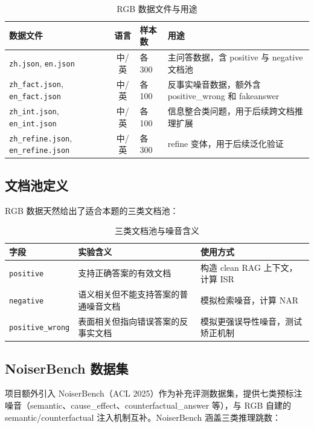 \documentclass[UTF8,zihao=-4]{ctexart}
\begin{document}
\begin{table}[H]
  \centering
  \caption{RGB 数据文件与用途}
  \begin{tabularx}{\textwidth}{lclY}
    \toprule
    数据文件 & 语言 & 样本数 & 用途 \\
    \midrule
    \texttt{zh.json}, \texttt{en.json} & 中/英 & 各 300 & 主问答数据，含 positive 与 negative 文档池 \\
    \texttt{zh\_fact.json}, \texttt{en\_fact.json} & 中/英 & 各 100 & 反事实噪音数据，额外含 positive\_wrong 和 fakeanswer \\
    \texttt{zh\_int.json}, \texttt{en\_int.json} & 中/英 & 各 100 & 信息整合类问题，用于后续跨文档推理扩展 \\
    \texttt{zh\_refine.json}, \texttt{en\_refine.json} & 中/英 & 各 300 & refine 变体，用于后续泛化验证 \\
    \bottomrule
  \end{tabularx}
\end{table}

\subsection{文档池定义}
RGB 数据天然给出了适合本题的三类文档池：

\begin{table}[H]
  \centering
  \caption{三类文档池与噪音含义}
  \begin{tabularx}{\textwidth}{lYY}
    \toprule
    字段 & 实验含义 & 使用方式 \\
    \midrule
    \texttt{positive} & 支持正确答案的有效文档 & 构造 clean RAG 上下文，计算 ISR \\
    \texttt{negative} & 语义相关但不能支持答案的普通噪音文档 & 模拟检索噪音，计算 NAR \\
    \texttt{positive\_wrong} & 表面相关但指向错误答案的反事实文档 & 模拟更强误导性噪音，测试矫正机制 \\
    \bottomrule
  \end{tabularx}
\end{table}

\subsection{NoiserBench 数据集}
项目额外引入 NoiserBench（ACL 2025）作为补充评测数据集，提供七类预标注噪音（semantic、cause\_effect、counterfactual\_answer 等），与 RGB 自建的 semantic/counterfactual 注入机制互补。NoiserBench 涵盖三类推理跳数：
\end{document}
